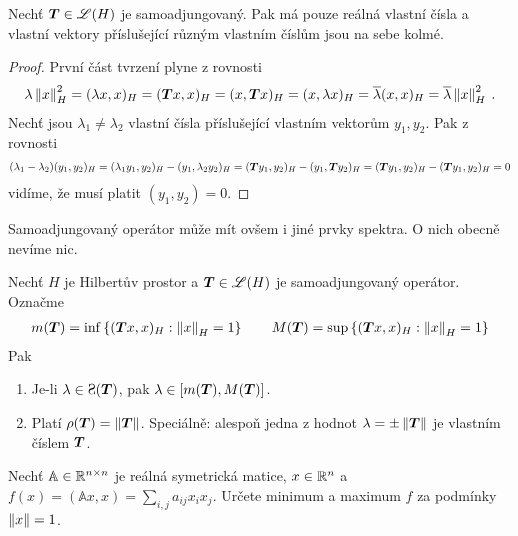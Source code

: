 \begin{lemma}
Nechť $\boldsymbol{T} \in \mathscr{L} (H)$ je samoadjungovaný. Pak má pouze reálná vlastní čísla a vlastní vektory příslušející různým vlastním číslům jsou na sebe kolmé.
\end{lemma}
\begin{proof}
První část tvrzení plyne z rovnosti \begin{align*}
\lambda \left\lVert x\right\rVert^2_H = (\lambda x, x)_H = (\boldsymbol{T} x,x)_H = (x, \boldsymbol{T} x)_H = (x, \lambda x)_H = \overline{\lambda} (x,x)_H = \overline{\lambda} \left\lVert x\right\rVert_H ^2 \:.
\end{align*}
Nechť jsou $\lambda_1 \neq \lambda_2$ vlastní čísla příslušející vlastním vektorům $y_1,y_2$. Pak z rovnosti \begin{align*}
    (\lambda_1 - \lambda_2)(y_1,y_2)_H = (\lambda_1 y_1,y_2)_H - (y_1, \lambda_2 y_2)_H = (\boldsymbol{T} y_1, y_2)_H - (y_1, \boldsymbol{T} y_2)_H = (\boldsymbol{T} y_1,y_2)_H - (\boldsymbol{T} y_1,y_2)_H = 0
\end{align*}
vidíme, že musí platit $(y_1,y_2)=0$.
\end{proof}
\begin{remark}
Samoadjungovaný operátor může mít ovšem i jiné prvky spektra. O nich obecně nevíme nic.
\end{remark}
\begin{theorem} \label{4.Spektralni vlastnosti samoadjug}
Nechť $H$ je Hilbertův prostor a $\boldsymbol{T} \in \mathscr{L} (H)$ je samoadjungovaný operátor. Označme \begin{align*}
    m(\boldsymbol{T}) = \inf \left \lbrace (\boldsymbol{T} x,x)_H : \left\lVert x\right\rVert_H = 1 \right \rbrace \qquad M(\boldsymbol{T}) = \sup \left \lbrace (\boldsymbol{T} x,x)_H : \left\lVert x\right\rVert_H = 1 \right \rbrace
\end{align*} Pak \begin{enumerate}
    \item Je-li $\lambda \in \Sp(\map T)$, pak $\lambda \in [m(\boldsymbol{T}), M(\boldsymbol{T})]$.
    \item Platí $\rho(\boldsymbol{T}) = \left\lVert\boldsymbol{T}\right\rVert$. Speciálně: alespoň jedna z hodnot $\lambda = \pm \left\lVert\boldsymbol{T}\right\rVert$ je vlastním číslem $\boldsymbol{T}$.
\end{enumerate}
\end{theorem} 

\begin{exercise}
Nechť $\mathbb{A} \in \mathbb{R}^{n \times n}$ je reálná symetrická matice, $x \in \mathbb{R}^n$ a $f(x) = (\mathbb{A} x,x) = \sum_{i,j} a_{ij} x_i x_j$. Určete minimum a maximum $f$ za podmínky $\left\lVert x\right\rVert =1$.
\end{exercise}

